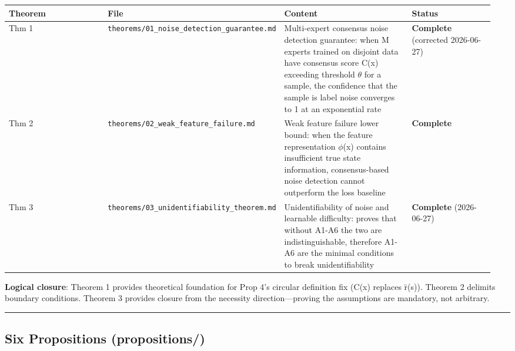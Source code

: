 \documentclass[
  12pt,
]{article}
\begin{document}
\begin{longtable}[]{@{}p{0.22\linewidth}p{0.28\linewidth}p{0.28\linewidth}p{0.18\linewidth}@{}}
\toprule\noalign{}
\begin{minipage}[b]{\linewidth}\raggedright
Theorem
\end{minipage} & \begin{minipage}[b]{\linewidth}\raggedright
File
\end{minipage} & \begin{minipage}[b]{\linewidth}\raggedright
Content
\end{minipage} & \begin{minipage}[b]{\linewidth}\raggedright
Status
\end{minipage} \\
\midrule\noalign{}
\endhead
\bottomrule\noalign{}
\endlastfoot
Thm 1 & \texttt{theorems/01\_noise\_detection\_guarantee.md} &
Multi-expert consensus noise detection guarantee: when M experts trained on disjoint data have consensus score C(x) exceeding threshold $\theta$ for a sample, the confidence that the sample is label noise converges to 1 at an exponential rate &
\textbf{Complete} (corrected 2026-06-27) \\
Thm 2 & \texttt{theorems/02\_weak\_feature\_failure.md} &
Weak feature failure lower bound: when the feature representation $\phi$(x) contains insufficient true state information, consensus-based noise detection cannot outperform the loss baseline &
\textbf{Complete} \\
Thm 3 & \texttt{theorems/03\_unidentifiability\_theorem.md} &
Unidentifiability of noise and learnable difficulty: proves that without A1-A6 the two are indistinguishable, therefore A1-A6 are the minimal conditions to break unidentifiability &
\textbf{Complete} (2026-06-27) \\
\end{longtable}

\textbf{Logical closure}: Theorem 1 provides theoretical foundation for Prop 4's circular definition fix (C(x) replaces \={r}(s)). Theorem 2 delimits boundary conditions. Theorem 3 provides closure from the necessity direction---proving the assumptions are mandatory, not arbitrary.

\begin{center}\rule{0.5\linewidth}{0.5pt}\end{center}

\subsection{Six Propositions (propositions/)}\label{six-propositions-propositions}
\end{document}

